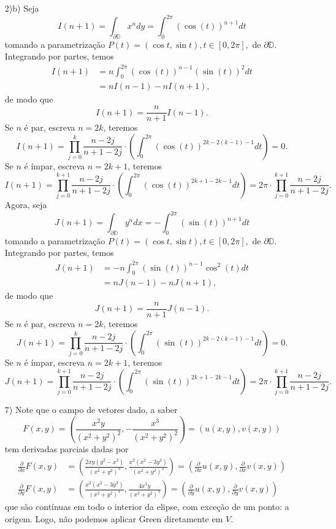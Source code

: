 \documentclass[12pt,a4paper]{article}
\begin{document}
\begin{enumerate}
	\item[2)b)] Seja
	$$
	I(n+1) = \int_{\partial\mathbb{D}}x^ndy = \int_{0}^{2\pi}(\cos(t))^{n+1}dt
	$$
	tomando a parametrização $P(t) = (\cos t, \sin t), t\in [0,2\pi],$ de $\partial\mathbb{D}$. Integrando por partes, temos
	\begin{align*}
	I(n+1) &= n\int_{0}^{2\pi}(\cos(t))^{n-1}(\sin(t))^2dt  \\
	&= nI(n-1) - nI(n+1),
	\end{align*}
	de modo que
	$$
	I(n+1) = \frac{n}{n+1}I(n-1).
	$$
	Se $n$ é par, escreva $n = 2k$, teremos
	$$
	I(n+1) = \prod_{j=0}^{k}\frac{n-2j}{n+1-2j}\cdot\left(\int_{0}^{2\pi}(\cos(t))^{2k-2(k-1)-1}dt\right) = 0.
	$$
	Se $n$ é ímpar, escreva $n = 2k+1$, teremos
	$$
	I(n+1) = \prod_{j=0}^{k+1}\frac{n-2j}{n+1-2j}\cdot\left(\int_{0}^{2\pi}(\cos(t))^{2k+1-2k-1}dt\right) = 2\pi\cdot\prod_{j=0}^{k+1}\frac{n-2j}{n+1-2j}.
	$$
	Agora, seja
	$$
	J(n+1) = \int_{\partial\mathbb{D}}y^ndx = -\int_{0}^{2\pi}(\sin(t))^{n+1}dt
	$$
	tomando a parametrização $P(t) = (\cos t, \sin t), t\in [0,2\pi],$ de $\partial\mathbb{D}$. Integrando por partes, temos
	\begin{align*}
	J(n+1) &= -n\int_{0}^{2\pi}(\sin(t))^{n-1}\cos^2(t)dt  \\
	&= nJ(n-1) - nJ(n+1),
	\end{align*}
	de modo que
	$$
	J(n+1) = \frac{n}{n+1}J(n-1).
	$$
	Se $n$ é par, escreva $n = 2k$, teremos
	$$
	J(n+1) = \prod_{j=0}^{k}\frac{n-2j}{n+1-2j}\cdot\left(\int_{0}^{2\pi}(\sin(t))^{2k-2(k-1)-1}dt\right) = 0.
	$$
	Se $n$ é ímpar, escreva $n = 2k+1$, teremos
	$$
	J(n+1) = \prod_{j=0}^{k+1}\frac{n-2j}{n+1-2j}\cdot\left( \int_{0}^{2\pi}(\sin(t))^{2k+1-2k-1}dt\right) = 2\pi\cdot\prod_{j=0}^{k+1}\frac{n-2j}{n+1-2j}.
	$$
	
	
	
	\item[7)] Note que o campo de vetores dado, a saber
	$$
	F(x,y) = \left( \frac{x^2y}{(x^2+y^2)^2}, -\frac{x^3}{(x^2+y^2)^2} \right) = (u(x,y), v(x,y))
	$$
	tem derivadas parciais dadas por
	\begin{align*}
	\frac{\partial}{\partial x}F(x,y) &= \left( \frac{2xy(y^2 - x^2)}{(x^2 + y^2)^3}, \frac{x^2(x^2-3y^2)}{(x^2+y^2)^3} \right) = \left( \frac{\partial}{\partial x}u(x,y), \frac{\partial}{\partial x}v(x,y) \right) \\
	\frac{\partial}{\partial y}F(x,y) &= \left(  \frac{x^2(x^2-3y^2)}{(x^2+y^2)^3}, \frac{4x^3y}{(x^2 + y^2)^3} \right) = \left( \frac{\partial}{\partial y}u(x,y), \frac{\partial}{\partial y}v(x,y) \right)
	\end{align*}
	que são contínuas em todo o interior da elipse, com exceção de um ponto: a origem. Logo, não podemos aplicar Green diretamente em $V$.
	

\end{enumerate}
\end{document}
